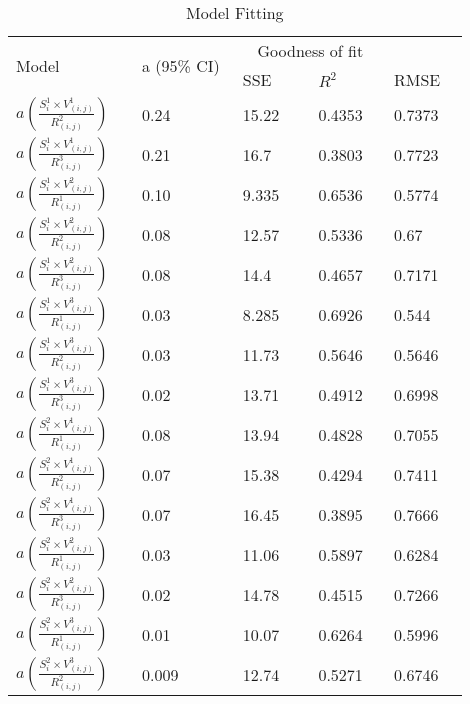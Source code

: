 \documentclass[10pt]{article}
\begin{document}
\begin{center}
\begin{table}[H]
\caption{Model Fitting}
\begin{center}
\begin{adjustbox}{width=0.5\textwidth} 
\begin{tabular}{|p{0.25\linewidth}|p{0.2\linewidth}|p{0.15\linewidth}|p{0.15\linewidth}|p{0.15\linewidth}|} 
\hline
\multirow{2}{*}{Model}&\multirow{2}{*}{a (95\% CI)}& \multicolumn{2}{c}{Goodness of fit} &\\   \cline{3-5}
& & SSE& $R^2$& RMSE\\
\hline
 $a(  \frac{S_{i}^1 \times V_{(i,j)}^1}{R_{(i,j)}^2})$ & 0.24 & 15.22 & 0.4353 & 0.7373\\
\hline
 $a(  \frac{S_{i}^1 \times V_{(i,j)}^1}{R_{(i,j)}^3}) $ & 0.21 & 16.7  & 0.3803 & 0.7723 \\
\hline
 $a(  \frac{S_{i}^1 \times V_{(i,j)}^2}{R_{(i,j)}^1})$ & 0.10 & 9.335 & 0.6536 & 0.5774 \\
\hline
$a(  \frac{S_{i}^1 \times V_{(i,j)}^2}{R_{(i,j)}^2})$ & 0.08 & 12.57 & 0.5336 & 0.67 \\
\hline
$a(  \frac{S_{i}^1 \times V_{(i,j)}^2}{R_{(i,j)}^3})$ & 0.08 & 14.4 & 0.4657 & 0.7171\\
\hline
$a(  \frac{S_{i}^1 \times V_{(i,j)}^3}{R_{(i,j)}^1})$ & 0.03 & 8.285 & 0.6926 & 0.544 \\
\hline
$a(  \frac{S_{i}^1 \times V_{(i,j)}^3}{R_{(i,j)}^2})$ & 0.03 & 11.73 & 0.5646 & 0.5646 \\
\hline
 $a(  \frac{S_{i}^1 \times V_{(i,j)}^3}{R_{(i,j)}^3})$ & 0.02 & 13.71 & 0.4912 & 0.6998 \\
\hline
 $a(  \frac{S_{i}^2 \times V_{(i,j)}^1}{R_{(i,j)}^1})$ & 0.08 & 13.94 & 0.4828 & 0.7055 \\
\hline
 $a(  \frac{S_{i}^2 \times V_{(i,j)}^1}{R_{(i,j)}^2})$ & 0.07 & 15.38 & 0.4294 & 0.7411  \\
\hline
$a(  \frac{S_{i}^2 \times V_{(i,j)}^1}{R_{(i,j)}^3})$ & 0.07 & 16.45 & 0.3895 & 0.7666  \\
\hline
 $a(  \frac{S_{i}^2 \times V_{(i,j)}^2}{R_{(i,j)}^1})$ & 0.03 & 11.06 & 0.5897 &  0.6284 \\
\hline
$a(  \frac{S_{i}^2 \times V_{(i,j)}^2}{R_{(i,j)}^3})$ & 0.02 & 14.78 & 0.4515 & 0.7266 \\
\hline
 $a(  \frac{S_{i}^2 \times V_{(i,j)}^3}{R_{(i,j)}^1})$ &  0.01 & 10.07 & 0.6264 &  0.5996 \\
\hline
 $a(  \frac{S_{i}^2 \times V_{(i,j)}^3}{R_{(i,j)}^2})$ & 0.009 & 12.74 & 0.5271 & 0.6746 \\

\end{tabular}
\end{adjustbox}
\end{center}
\end{table}
\end{center}
\end{document}
